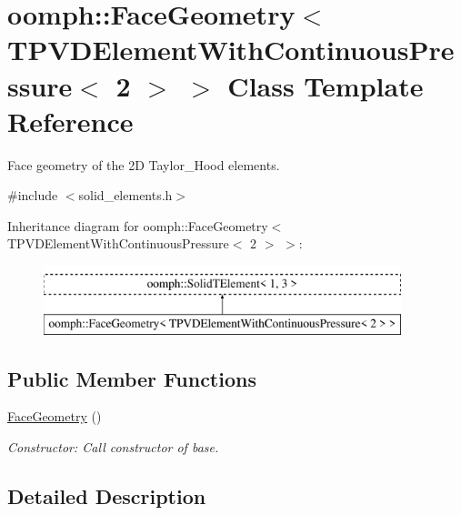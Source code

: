 \hypertarget{classoomph_1_1FaceGeometry_3_01TPVDElementWithContinuousPressure_3_012_01_4_01_4}{}\section{oomph\+:\+:Face\+Geometry$<$ T\+P\+V\+D\+Element\+With\+Continuous\+Pressure$<$ 2 $>$ $>$ Class Template Reference}
\label{classoomph_1_1FaceGeometry_3_01TPVDElementWithContinuousPressure_3_012_01_4_01_4}


Face geometry of the 2D Taylor\+\_\+\+Hood elements.  




{\ttfamily \#include $<$solid\+\_\+elements.\+h$>$}

Inheritance diagram for oomph\+:\+:Face\+Geometry$<$ T\+P\+V\+D\+Element\+With\+Continuous\+Pressure$<$ 2 $>$ $>$\+:\begin{figure}[H]
\begin{center}
\leavevmode
\includegraphics[height=2.000000cm]{classoomph_1_1FaceGeometry_3_01TPVDElementWithContinuousPressure_3_012_01_4_01_4}
\end{center}
\end{figure}
\subsection*{Public Member Functions}
\begin{DoxyCompactItemize}
\item 
\hyperlink{classoomph_1_1FaceGeometry_3_01TPVDElementWithContinuousPressure_3_012_01_4_01_4_a2f239ef2e6e8fdf3b6573a05d30147b2}{Face\+Geometry} ()
\begin{DoxyCompactList}\small\item\em Constructor\+: Call constructor of base. \end{DoxyCompactList}\end{DoxyCompactItemize}


\subsection{Detailed Description}
